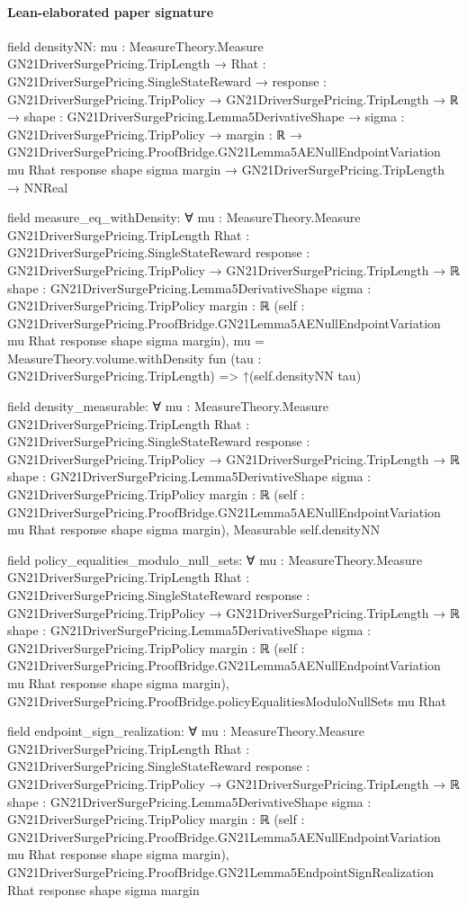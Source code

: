 \documentclass[10pt]{article}
\begin{document}
\paragraph{Lean-elaborated paper signature}
\begin{ReviewVerbatim}
field densityNN:
{mu : MeasureTheory.Measure GN21DriverSurgePricing.TripLength} →
  {Rhat : GN21DriverSurgePricing.SingleStateReward} →
    {response : GN21DriverSurgePricing.TripPolicy → GN21DriverSurgePricing.TripLength → ℝ} →
      {shape : GN21DriverSurgePricing.Lemma5DerivativeShape} →
        {sigma : GN21DriverSurgePricing.TripPolicy} →
          {margin : ℝ} →
            GN21DriverSurgePricing.ProofBridge.GN21Lemma5AENullEndpointVariation mu Rhat response shape sigma margin →
              GN21DriverSurgePricing.TripLength → NNReal

field measure_eq_withDensity:
∀ {mu : MeasureTheory.Measure GN21DriverSurgePricing.TripLength} {Rhat : GN21DriverSurgePricing.SingleStateReward}
  {response : GN21DriverSurgePricing.TripPolicy → GN21DriverSurgePricing.TripLength → ℝ}
  {shape : GN21DriverSurgePricing.Lemma5DerivativeShape} {sigma : GN21DriverSurgePricing.TripPolicy} {margin : ℝ}
  (self : GN21DriverSurgePricing.ProofBridge.GN21Lemma5AENullEndpointVariation mu Rhat response shape sigma margin),
  mu = MeasureTheory.volume.withDensity fun (tau : GN21DriverSurgePricing.TripLength) => ↑(self.densityNN tau)

field density_measurable:
∀ {mu : MeasureTheory.Measure GN21DriverSurgePricing.TripLength} {Rhat : GN21DriverSurgePricing.SingleStateReward}
  {response : GN21DriverSurgePricing.TripPolicy → GN21DriverSurgePricing.TripLength → ℝ}
  {shape : GN21DriverSurgePricing.Lemma5DerivativeShape} {sigma : GN21DriverSurgePricing.TripPolicy} {margin : ℝ}
  (self : GN21DriverSurgePricing.ProofBridge.GN21Lemma5AENullEndpointVariation mu Rhat response shape sigma margin),
  Measurable self.densityNN

field policy_equalities_modulo_null_sets:
∀ {mu : MeasureTheory.Measure GN21DriverSurgePricing.TripLength} {Rhat : GN21DriverSurgePricing.SingleStateReward}
  {response : GN21DriverSurgePricing.TripPolicy → GN21DriverSurgePricing.TripLength → ℝ}
  {shape : GN21DriverSurgePricing.Lemma5DerivativeShape} {sigma : GN21DriverSurgePricing.TripPolicy} {margin : ℝ}
  (self : GN21DriverSurgePricing.ProofBridge.GN21Lemma5AENullEndpointVariation mu Rhat response shape sigma margin),
  GN21DriverSurgePricing.ProofBridge.policyEqualitiesModuloNullSets mu Rhat

field endpoint_sign_realization:
∀ {mu : MeasureTheory.Measure GN21DriverSurgePricing.TripLength} {Rhat : GN21DriverSurgePricing.SingleStateReward}
  {response : GN21DriverSurgePricing.TripPolicy → GN21DriverSurgePricing.TripLength → ℝ}
  {shape : GN21DriverSurgePricing.Lemma5DerivativeShape} {sigma : GN21DriverSurgePricing.TripPolicy} {margin : ℝ}
  (self : GN21DriverSurgePricing.ProofBridge.GN21Lemma5AENullEndpointVariation mu Rhat response shape sigma margin),
  GN21DriverSurgePricing.ProofBridge.GN21Lemma5EndpointSignRealization Rhat response shape sigma margin
\end{ReviewVerbatim}
\end{document}
